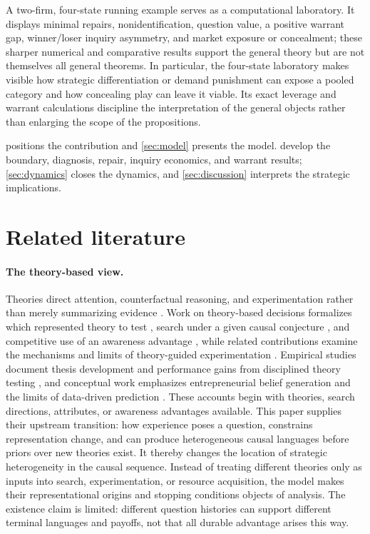 \documentclass[11pt]{article}
\theoremstyle{definition}
\begin{document}
A two-firm, four-state running example serves as a computational laboratory.
It displays minimal repairs, nonidentification, question value, a positive warrant gap, winner/loser inquiry asymmetry, and market exposure or concealment; these sharper numerical and comparative results support the general theory but are not themselves all general theorems.
In particular, the four-state laboratory makes visible how strategic differentiation or demand punishment can expose a pooled category and how concealing play can leave it viable.
Its exact leverage and warrant calculations discipline the interpretation of the general objects rather than enlarging the scope of the propositions.

 positions the contribution and \cref{sec:model} presents the model.
 develop the boundary, diagnosis, repair, inquiry economics, and warrant results; \cref{sec:dynamics} closes the dynamics, and \cref{sec:discussion} interprets the strategic implications.
\section{Related literature}
\label{sec:literature}

\paragraph{The theory-based view.}
Theories direct attention, counterfactual reasoning, and experimentation rather than merely summarizing evidence \citep{FelinZenger2017}.
Work on theory-based decisions formalizes which represented theory to test \citep{CamuffoEtAl2024}, search under a given causal conjecture \citep{ChavdaGansStern2024}, and competitive use of an awareness advantage \citep{EhrigZenger2024}, while related contributions examine the mechanisms and limits of theory-guided experimentation \citep{FelinGambardellaZenger2024,Sorenson2024,AdnerLevinthal2024}.
Empirical studies document thesis development and performance gains from disciplined theory testing \citep{OttHannah2024,CamuffoEtAl2020}, and conceptual work emphasizes entrepreneurial belief generation and the limits of data-driven prediction \citep{ZellwegerZenger2023,FelinHolweg2024}.
These accounts begin with theories, search directions, attributes, or awareness advantages available.
This paper supplies their upstream transition: how experience poses a question, constrains representation change, and can produce heterogeneous causal languages before priors over new theories exist.
It thereby changes the location of strategic heterogeneity in the causal sequence.
Instead of treating different theories only as inputs into search, experimentation, or resource acquisition, the model makes their representational origins and stopping conditions objects of analysis.
The existence claim is limited: different question histories can support different terminal languages and payoffs, not that all durable advantage arises this way.
\end{document}
